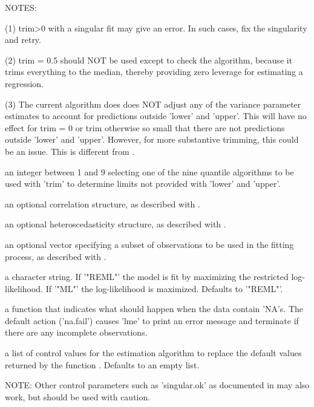 \begin{Arguments}
\begin{ldescription}
NOTES:

(1) trim>0 with a singular fit may give an error.  In such cases,
fix the singularity and retry.

(2) trim = 0.5 should NOT be used except to check the algorithm,
because it trims everything to the median, thereby providing zero
leverage for estimating a regression.

(3) The current algorithm does does NOT adjust any of the variance
parameter estimates to account for predictions outside 'lower' and
'upper'.  This will have no effect for trim = 0 or trim otherwise so
small that there are not predictions outside 'lower' and 'upper'.
However, for more substantive trimming, this could be an issue.
This is different from . 

\item[\code{quantileType}] an integer between 1 and 9 selecting one of the nine quantile
algorithms to be used with 'trim' to determine limits not provided
with 'lower' and 'upper'.  

\item[\code{correlation}] an optional correlation structure, as described with
. 

\item[\code{weights}] an optional heteroscedasticity structure, as described with
. 

\item[\code{ subset }] an optional vector specifying a subset of observations to be used in
the fitting process, as described with .  

\item[\code{method}] a character string.  If '"REML"' the model is fit by maximizing the
restricted log-likelihood.  If '"ML"' the log-likelihood is
maximized.  Defaults to '"REML"'. 

\item[\code{ na.action }] a function that indicates what should happen when the data contain
'NA's.  The default action ('na.fail') causes 'lme' to print an
error message and terminate if there are any incomplete
observations. 

\item[\code{control}] a list of control values for the estimation algorithm to replace the
default values returned by the function
. Defaults to an empty list.

NOTE:  Other control parameters such as 'singular.ok' as documented
in  may also work, but should be used with
caution.  


\end{ldescription}
\end{Arguments}
